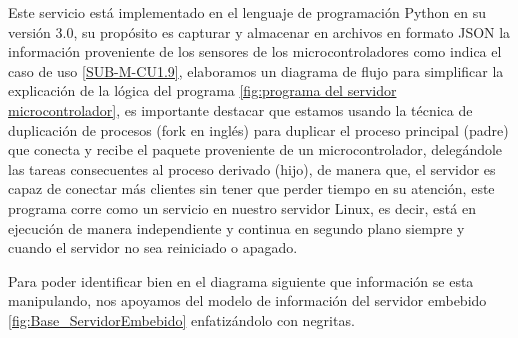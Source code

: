 Este servicio está implementado en el lenguaje de programación Python en su versión 3.0, su propósito es capturar y almacenar en archivos en formato JSON la información proveniente de los sensores de los microcontroladores como indica el caso de uso \ref{SUB-M-CU1.9}, elaboramos un diagrama de flujo para simplificar la explicación de la lógica del programa \ref{fig:programa del servidor microcontrolador}, es importante destacar que estamos usando la técnica de duplicación de procesos (fork en inglés) para duplicar el proceso principal (padre) que conecta y recibe el paquete proveniente de un microcontrolador, delegándole las tareas consecuentes al proceso derivado (hijo), de manera que, el servidor es capaz de conectar más clientes sin tener que perder tiempo en su atención, este programa corre como un servicio en nuestro servidor Linux, es decir, está en ejecución de manera independiente y continua en segundo plano siempre y cuando el servidor no sea reiniciado o apagado.

Para poder identificar bien en el diagrama siguiente que información se esta manipulando, nos apoyamos del modelo de información del servidor embebido  \ref{fig:Base_ServidorEmbebido} enfatizándolo con negritas.

